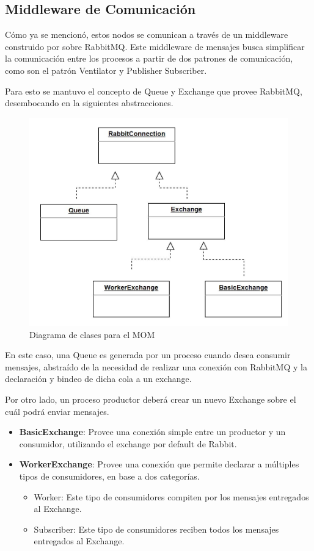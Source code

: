 \documentclass[titlepage,a4paper,oneside]{article}
\begin{document}
\subsection{Middleware de Comunicación}

Cómo ya se mencionó, estos nodos se comunican a través de un middleware construido por sobre RabbitMQ.
Este middleware de mensajes busca simplificar la comunicación entre los procesos a partir de dos patrones de comunicación, como son el patrón Ventilator y Publisher Subscriber.

Para esto se mantuvo el concepto de Queue y Exchange que provee RabbitMQ, desembocando en la siguientes abstracciones.

\begin{figure}[H]
	\centering
	\includegraphics[width=13cm]{img/mom_class.JPG}
	\caption{Diagrama de clases para el MOM}
\end{figure}

En este caso, una Queue es generada por un proceso cuando desea consumir mensajes, abstraído de la necesidad de realizar una conexión con RabbitMQ y la declaración y bindeo de dicha cola a un exchange.

Por otro lado, un proceso productor deberá crear un nuevo Exchange sobre el cuál podrá enviar mensajes.

\begin{itemize}
    \item \textbf{BasicExchange}: Provee una conexión simple entre un productor y un consumidor, utilizando el exchange por default de Rabbit.
    \item \textbf{WorkerExchange}: Provee una conexión que permite declarar a múltiples tipos de consumidores, en base a dos categorías.
        \begin{itemize}
            \item Worker: Este tipo de consumidores compiten por los mensajes entregados al Exchange.
            \item Subscriber: Este tipo de consumidores reciben todos los mensajes entregados al Exchange.
        \end{itemize}
\end{itemize}
\end{document}

